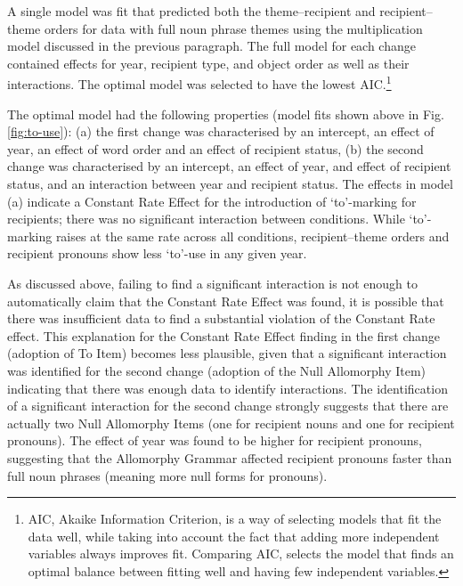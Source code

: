 	A single model was fit that predicted both the theme--recipient and recipient--theme orders for data with full noun phrase themes using the multiplication model discussed in the previous paragraph. The full model for each change contained effects for year, recipient type, and object order as well as their interactions. The optimal model was selected to have the lowest AIC.\footnote{AIC, Akaike Information Criterion, is a way of selecting models that fit the data well, while taking into account the fact that adding more independent variables always improves fit. Comparing AIC, selects the model that finds an optimal balance between fitting well and having few independent variables.} 
	
	The optimal model had the following properties (model fits shown above in Fig. \ref{fig:to-use}): (a) the first change was characterised by an intercept, an effect of year, an effect of word order and an effect of recipient status, (b) the second change was characterised by an intercept, an effect of year, and effect of recipient status, and an interaction between year and recipient status. The effects in model (a) indicate a Constant Rate Effect for the introduction of `to'-marking for recipients; there was no significant interaction between conditions. While `to'-marking raises at the same rate across all conditions, recipient--theme orders and recipient pronouns show less `to'-use in any given year. 
	
	As discussed above, failing to find a significant interaction is not enough to automatically claim that the Constant Rate Effect was found, it is possible that there was insufficient data to find a substantial violation of the Constant Rate effect. This explanation for the Constant Rate Effect finding in the first change (adoption of To Item) becomes less plausible, given that a significant interaction was identified for the second change (adoption of the Null Allomorphy Item) indicating that there was enough data to identify interactions. The identification of a significant interaction for the second change strongly suggests that there are actually two Null Allomorphy Items (one for recipient nouns and one for recipient pronouns). The effect of year was found to be higher for recipient pronouns, suggesting that the Allomorphy Grammar affected recipient pronouns faster than full noun phrases (meaning more null forms for pronouns).
	
